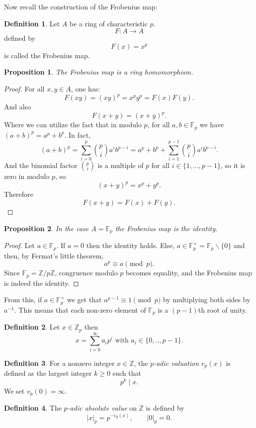 \documentclass[oneside, a4paper, onecolumn, 11pt]{article}
\newtheorem{proposition}{Proposition}
\theoremstyle{definition}
\newtheorem{definition}{Definition}[section]
\begin{document}
Now recall the construction of the Frobenius map:
\begin{definition}
  Let $A$ be a ring of characteristic $p$. \[F: A \to A\] defined by \[F(x) = x^p\] is called the Frobenius map.
\end{definition} 
\begin{proposition}
  The Frobenius map is a ring homomorphism.
\end{proposition}
\begin{proof}
  For all $x,y\in A$, one has:
  \[F(xy) = (xy)^p = x^p y^p = F(x)F(y).\]
  And also \[F(x+y) = (x+y)^p.\]
  Where we can utilize the fact that in modulo $p$, for all $a,b\in \mathbb{F}_p$ we have $(a+b)^p=a^p+b^p$. In fact, \[(a+b)^p = \sum_{i=0}^{p}\binom{p}{i}a^ib^{p-i} = a^p+b^p+\sum_{i=1}^{p-1}\binom{p}{i}a^ib^{p-i}.\]
  And the binomial factor $\binom{p}{i}$ is a multiple of $p$ for all $i\in\{1,\ldots,p-1\}$, so it is zero in modulo $p$, so
  \[(x+y)^p = x^p + y^p.\]
  Therefore \[F(x+y)=F(x)+F(y).\]
\end{proof}
\begin{proposition}
  In the case $A=\mathbb{F}_p$ the Frobenius map is the identity.
\end{proposition}
\begin{proof}
  Let $a\in \mathbb{F}_p$. If $a=0$ then the identity holds. Else, $a\in\mathbb{F}_p^{\times}= \mathbb{F}_p\backslash\{0\}$
  and then, by Fermat's little theorem, \[a^p\equiv a \pmod p.\]
  Since $\mathbb{F}_p = \mathbb{Z}/p\mathbb{Z}$, congruence modulo $p$ becomes equality, and the Frobenius map is indeed the identity.
\end{proof}
From this, if $a\in\mathbb{F}_p^{\times}$ we get that $a^{p-1}\equiv1\pmod p$ by multiplying both sides by $a^{-1}$. This means that each non-zero element of $\mathbb{F}_p$ is a $(p-1)$th root of unity.

\begin{definition}
  Let $x\in\mathbb{Z}_p$ then \[x=\sum_{i=0}^{\infty}a_ip^i \text{  with  } a_i\in\{0,..,p-1\}.\]
\end{definition}
\begin{definition}
For a nonzero integer $x\in\mathbb Z$, the \emph{$p$-adic valuation} $v_p(x)$ is defined as the largest integer $k\ge0$ such that
\[p^k \mid x.\]
We set $v_p(0)=\infty$.
\end{definition}
\begin{definition}
The \emph{$p$-adic absolute value} on $\mathbb Z$ is defined by \[|x|_p = p^{-v_p(x)}, \qquad |0|_p=0.\]
\end{definition}
\end{document}
